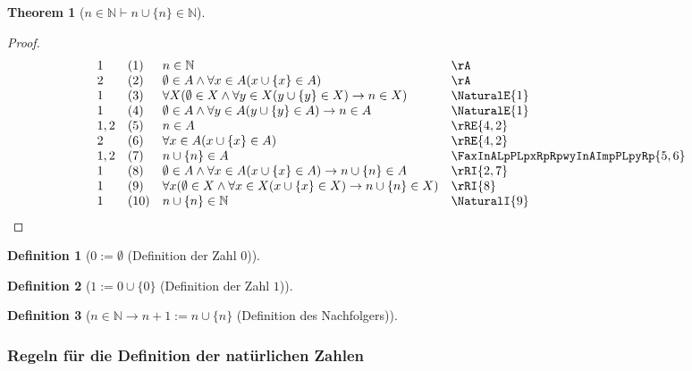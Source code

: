 \documentclass{book}
\theoremstyle{plain}
\newtheorem{theorem}{Theorem}
\theoremstyle{remark}
\theoremstyle{definition}
\newtheorem{definition}{Definition}[section]
\begin{document}
\label{nInNaturalImpncuLbnRbInNatural}
\begin{theorem}[\(n\in\mathbb{N}\vdash n\cup\{n\}\in\mathbb{N}\)]
\end{theorem}
\begin{proof}
	\[
	\begin{array}{llll}
		1 & (1) & n\in\mathbb{N} & \rA \\
		2 & (2) & \emptyset\in A\land \forall x\in A(x\cup \{x\}\in A) & \rA \\
		1 & (3) & \forall X(\emptyset\in X\land \forall y\in X(y\cup \{y\}\in X)\rightarrow n\in X) & \NaturalE{1} \\
		1 & (4) & \emptyset\in A\land \forall y\in A(y\cup \{y\}\in A)\rightarrow n\in A & \NaturalE{1} \\
		1,2 & (5) & n\in A & \rRE{4,2} \\
		2 & (6) & \forall x\in A(x\cup \{x\}\in A) & \rRE{4,2} \\
		1,2 & (7) & n\cup \{n\}\in A & \FaxInALpPLpxRpRpwyInAImpPLpyRp{5,6} \\
		1 & (8) & \emptyset\in A\land \forall x\in A(x\cup \{x\}\in A)\rightarrow n\cup \{n\}\in A & \rRI{2,7} \\
		1 & (9) & \forall x(\emptyset\in X\land \forall x\in X(x\cup \{x\}\in X)\rightarrow n\cup \{n\}\in X) & \rRI{8} \\	
		1 & (10) & n\cup \{n\}\in \mathbb{N} & \NaturalI{9} \\
	\end{array}
	\]
\end{proof}

\begin{definition}[\(0:=\emptyset\) (Definition der Zahl \(0\))]
\end{definition}


\begin{definition}[\(1 := 0\cup \{0\}\) (Definition der Zahl \(1\))]
\end{definition}

\begin{definition}[\(n\in\mathbb{N}\rightarrow n+1:=n\cup\{n\}\) (Definition des Nachfolgers)]
\end{definition}

\subsubsection{Regeln für die Definition der natürlichen Zahlen}

\label{rule:zeroSetDefinition} \label{rule:oneSetDefinition} \label{rule:successorSetDefinition}
\end{document}
